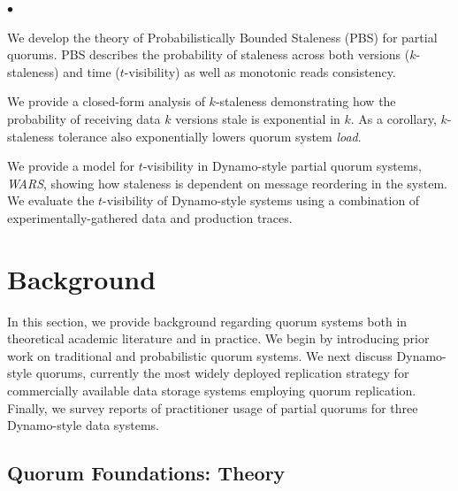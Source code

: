 \documentclass{vldb}
\newcommand{\sectionskip}{-0em}
\newcommand{\subsectionskip}{-0em}
\newenvironment{myitemize}
{
   \vspace{-.5em}
    \begin{list}{$\bullet$ }{}
        \setlength{\topsep}{0pt}
        \setlength{\parskip}{0pt}
        \setlength{\partopsep}{0pt}
        \setlength{\parsep}{0pt}         
        \setlength{\itemsep}{.5em} 
}
{
    \end{list} 
    \vspace{-.5em}
}
\begin{document}
\begin{myitemize}

\item We develop the theory of Probabilistically Bounded Staleness
  (PBS) for partial quorums. PBS describes the probability of
  staleness across both versions ($k$-staleness) and time
  ($t$-visibility) as well as monotonic reads consistency.

\item We provide a closed-form analysis of $k$-staleness demonstrating
  how the probability of receiving data $k$ versions stale is
  exponential in $k$.  As a corollary, $k$-staleness tolerance also
  exponentially lowers quorum system \textit{load}.

\item We provide a model for $t$-visibility in
  Dynamo-style partial quorum systems, \textit{WARS},  showing how
  staleness is dependent on message reordering in the system.  We
  evaluate the $t$-visibility of Dynamo-style systems using a
  combination of experimentally-gathered data and production traces.

\end{myitemize}

\vspace{\sectionskip}\section{Background}
\label{sec:background}

In this section, we provide background regarding quorum systems both
in theoretical academic literature and in practice.  We begin by
introducing prior work on traditional and probabilistic quorum
systems.  We next discuss Dynamo-style quorums, currently the most
widely deployed replication strategy for commercially available data
storage systems employing quorum replication.  Finally, we survey
reports of practitioner usage of partial quorums for three
Dynamo-style data systems.

\vspace{\subsectionskip}\subsection{Quorum Foundations: Theory}
\end{document}
